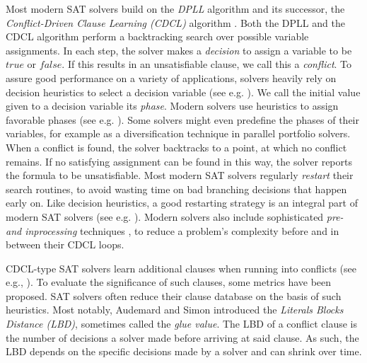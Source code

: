 \documentclass[12pt,a4paper,twoside]{scrartcl}
\numberwithin{equation}{section}
\begin{document}
Most modern SAT solvers build on the \textit{DPLL} \cite{dpllPaper} algorithm and its successor, the \textit{Conflict-Driven Clause Learning (CDCL)} algorithm \cite{cdclSolvers}. Both the DPLL and the CDCL algorithm perform a backtracking search over possible variable assignments. In each step, the solver makes a \textit{decision} to assign a variable to be $true$ or $false$. If this results in an unsatisfiable clause, we call this a \textit{conflict}. To assure good performance on a variety of applications, solvers heavily rely on decision heuristics to select a decision variable (see e.g. \cite{biere2015evaluating, moskewicz2001chaff, biere2008adaptive}). We call the initial value given to a decision variable its \textit{phase}. Modern solvers use heuristics to assign favorable phases (see e.g. \cite{componentPhases, cai2022better}). Some solvers might even predefine the phases of their variables, for example as a diversification technique in parallel portfolio solvers.
When a conflict is found, the solver backtracks to a point, at which no conflict remains. If no satisfying assignment can be found in this way, the solver reports the formula to be unsatisfiable. Most modern SAT solvers regularly \textit{restart} their search routines, to avoid wasting time on bad branching decisions that happen early on. Like decision heuristics, a good restarting strategy is an integral part of modern SAT solvers (see e.g. \cite{gomes1998boosting, gomes2000heavy, oh2015between}). Modern solvers also include sophisticated \textit{pre- and inprocessing} techniques \cite{biere2021preprocessing}, to reduce a problem's complexity before and in between their CDCL loops.

CDCL-type SAT solvers learn additional clauses when running into conflicts (see e.g., \cite{silva1996grasp, beame2003understanding, allUIPclauselearning, allUIPclauselearningBetter}). To evaluate the significance of such clauses, some metrics have been proposed. SAT solvers often reduce their clause database on the basis of such heuristics. Most notably, Audemard and Simon \cite{lbdPaper} introduced the \textit{Literals Blocks Distance (LBD)}, sometimes called the \textit{glue value}. The LBD of a conflict clause is the number of decisions a solver made before arriving at said clause. As such, the LBD depends on the specific decisions made by a solver and can shrink over time.
\end{document}
